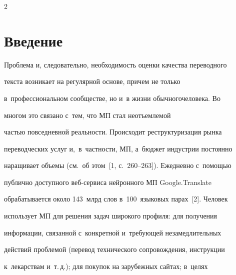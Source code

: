




\thispagestyle{headings}





\begin{multicols}{2}





\label{st\stat}


  


  \section{Введение}


  


  \vspace*{-3pt}


  


  Проблема и, следовательно, необходимость оценки качества переводного 


текста возникает на регулярной основе, причем не только 


в~профессиональном сообществе, но и~в жизни обычного\linebreak человека. Во 


многом это связано с~тем, что МП стал неотъемлемой 


частью повседневной ре\-аль\-ности. Происходит реструктуризация рынка 


переводческих услуг и,~в~част\-ности, МП, а~бюджет индустрии постоянно 


наращивает объемы (см.\ об этом~[1, с.~260--263]). Ежедневно с~по\-мощью 


пуб\-лич\-но доступного веб-сер\-ви\-са нейронного МП Google.Translate 


обрабатывается около 143~млрд слов в~100~языковых парах~[2]. Человек 


\mbox{использует} МП для решения задач широкого профиля: для получения 


информации, связанной с~конкретной и~требующей незамедлительных 


действий проблемой (перевод технического со\-про\-вож\-де\-ния, инструкции 


к~лекарствам и~т.\,д.); для покупок на зарубежных сайтах; в~целях 



\end{multicols}
